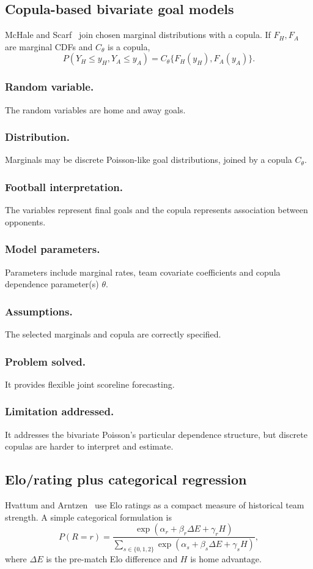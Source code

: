 \documentclass[11pt,a4paper]{amsart}
\numberwithin{equation}{section}
\begin{document}
\subsection{Copula-based bivariate goal models}
McHale and Scarf~\cite{mchalescarf2007} join chosen marginal distributions with a copula. If $F_H,F_A$ are marginal CDFs and $C_\theta$ is a copula,
\begin{equation}P(Y_H\le y_H,Y_A\le y_A)=C_\theta\{F_H(y_H),F_A(y_A)\}.
\end{equation}

\subsubsection*{Random variable.} The random variables are home and away goals.
\subsubsection*{Distribution.} Marginals may be discrete Poisson-like goal distributions, joined by a copula $C_\theta$.
\subsubsection*{Football interpretation.} The variables represent final goals and the copula represents association between opponents.
\subsubsection*{Model parameters.} Parameters include marginal rates, team covariate coefficients and copula dependence parameter(s) $\theta$.
\subsubsection*{Assumptions.} The selected marginals and copula are correctly specified.
\subsubsection*{Problem solved.} It provides flexible joint scoreline forecasting.
\subsubsection*{Limitation addressed.} It addresses the bivariate Poisson's particular dependence structure, but discrete copulas are harder to interpret and estimate.

\subsection{Elo/rating plus categorical regression}
Hvattum and Arntzen~\cite{hvattum2010} use Elo ratings as a compact measure of historical team strength. A simple categorical formulation is
\begin{equation}P(R=r)=\frac{\exp(\alpha_r+\beta_r\Delta E+\gamma_r H)}{\sum_{s\in\{0,1,2\}}\exp(\alpha_s+\beta_s\Delta E+\gamma_s H)},
\end{equation}
where $\Delta E$ is the pre-match Elo difference and $H$ is home advantage.
\end{document}

